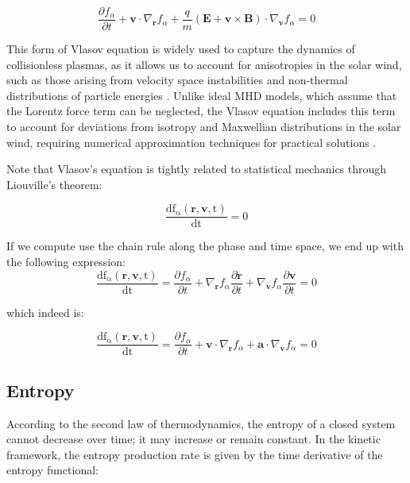 \documentclass[12pt]{article}
\begin{document}
\begin{equation}
    \frac{\partial f_\alpha}{\partial t} + \mathbf{v} \cdot \nabla_{\mathbf{r}} f_\alpha + \frac{q}{m} (\mathbf{E} + \mathbf{v} \times \mathbf{B}) \cdot \nabla_{\mathbf{v}} f_\alpha = 0
\end{equation}

This form of Vlasov equation is widely used to capture the dynamics of collisionless plasmas, as it allows us to account for anisotropies in the solar wind, such as those arising from velocity space instabilities and non-thermal distributions of particle energies \cite{Verscharen_2016}. Unlike ideal MHD models, which assume that the Lorentz force term can be neglected, the Vlasov equation includes this term to account for deviations from isotropy and Maxwellian distributions in the solar wind, requiring numerical approximation techniques for practical solutions \cite{grandin2023hybridvlasovsimulationsoftxray}.

Note that Vlasov's equation is tightly related to statistical mechanics through Liouville's theorem:

\begin{equation}
    \frac{\mathrm{df_\alpha(\mathbf{r}, \mathbf{v}, t)}}{\mathrm{dt}} = 0
\end{equation}

If we compute use the chain rule along the phase and time space, we end up with the following expression:
\begin{equation}
    \frac{\mathrm{df_\alpha(\mathbf{r}, \mathbf{v}, t)}}{\mathrm{dt}} = \frac{\partial f_\alpha}{\partial t} + \nabla_{\mathbf{r}} f_\alpha \frac{\partial \mathbf{r}}{\partial t} + \nabla_{\mathbf{v}} f_\alpha \frac{\partial \mathbf{v}}{\partial t} = 0
\end{equation}

which indeed is:

\begin{equation}
    \frac{\mathrm{df_\alpha(\mathbf{r}, \mathbf{v}, t)}}{\mathrm{dt}} = \frac{\partial f_\alpha}{\partial t} + \mathbf{v} \cdot \nabla_{\mathbf{r}} f_\alpha + \mathbf{a} \cdot \nabla_{\mathbf{v}} f_\alpha = 0
\end{equation}


\subsection{Entropy}

According to the second law of thermodynamics, the entropy of a closed system cannot decrease over time; it may increase or remain constant. In the kinetic framework, the entropy production rate is given by the time derivative of the entropy functional:
\end{document}

